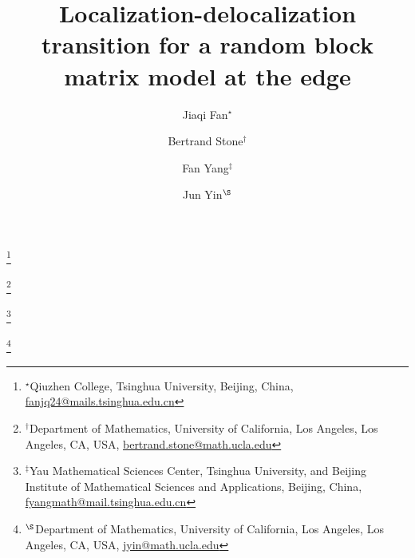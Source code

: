 \documentclass[10pt,reqno]{amsart}
\numberwithin{equation}{section}
\numberwithin{figure}{section}
\theoremstyle{plain} %
\theoremstyle{definition} %
\numberwithin{equation}{section}
\begin{document}

\title{Localization-delocalization transition for a random block matrix model at the edge}

\author{Jiaqi Fan$^\star$}
\thanks{$^\star$Qiuzhen College, Tsinghua University, Beijing, China, \href{mailto:fanjq24@mails.tsinghua.edu.cn}{fanjq24@mails.tsinghua.edu.cn}}


\author{Bertrand Stone$^\dagger$}
\thanks{$^\dagger$Department of Mathematics, University of California, Los Angeles, Los Angeles, CA, USA, \href{mailto:bertrand.stone@math.ucla.edu}{bertrand.stone@math.ucla.edu}}


\author{Fan Yang$^\ddagger$}
\thanks{$^\ddagger$Yau Mathematical Sciences Center, Tsinghua University, and Beijing Institute of Mathematical Sciences and Applications, Beijing, China,
\href{mailto:fyangmath@mail.tsinghua.edu.cn}{fyangmath@mail.tsinghua.edu.cn}}


\author{Jun Yin$^\S$}
\thanks{$^\S$Department of Mathematics, University of California, Los Angeles, Los Angeles, CA, USA,
\href{mailto:jyin@math.ucla.edu}{jyin@math.ucla.edu}}

\end{document}
